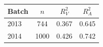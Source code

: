 \begin{tabular}{@{}lccc@{}}
\toprule
Batch & $n$ & $R^2_V$ & $R^2_A$ \\
\midrule
2013 & 744 & 0.367 & 0.645 \\
2014 & 1000 & 0.426 & 0.742 \\
\bottomrule
\end{tabular}
